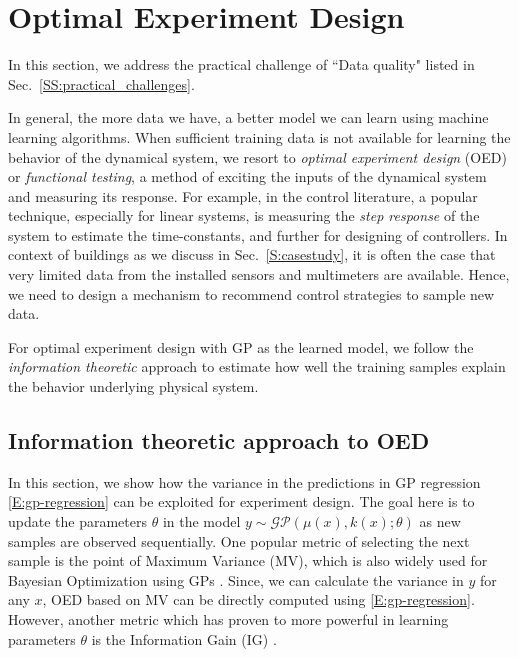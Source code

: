\section{Optimal Experiment Design}
\label{S:oed}

In this section, we address the practical challenge of ``Data quality" listed in Sec.~\ref{SS:practical_challenges}.

In general, the more data we have, a better model we can learn using machine learning algorithms. When sufficient training data is not available for learning the behavior of the dynamical system, we resort to \textit{optimal experiment design} (OED) or \textit{functional testing}, a method of exciting the inputs of the dynamical system and measuring its response. For example, in the control literature, a popular technique, especially for linear systems, is measuring the \textit{step response} of the system to estimate the time-constants, and further for designing of controllers. In context of buildings as we discuss in Sec.~\ref{S:casestudy}, it is often the case that very limited data from the installed sensors and multimeters are available. Hence, we need to design a mechanism to recommend control strategies to sample new data.

For optimal experiment design with GP as the learned model, we follow the \textit{information theoretic} approach to estimate how well the training samples explain the behavior underlying physical system.

\subsection{Information theoretic approach to OED}
\label{SS:information-theory}

In this section, we show how the variance in the predictions in GP regression \eqref{E:gp-regression} can be exploited for experiment design.
The goal here is to update the parameters \(\theta\) in the model \(y \sim \mathcal{GP}(\mu(x), k(x); \theta)\) as new samples are observed sequentially. One popular metric of selecting the next sample is the point of Maximum Variance (MV), which is also widely used for Bayesian Optimization using GPs \cite{Snoek2012}. Since, we can calculate the variance in \(y\) for any \(x\), OED based on MV can be directly computed using \eqref{E:gp-regression}. However, another metric which has proven to more powerful in learning parameters \(\theta\) is the Information Gain (IG) \cite{Krause2008}. 

